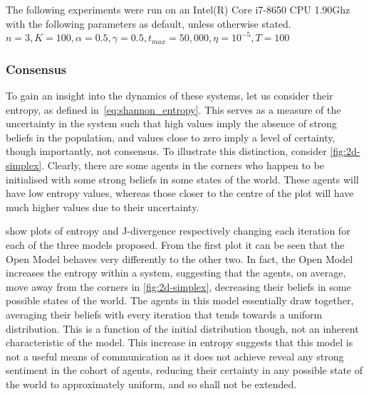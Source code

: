 The following experiments were run on an Intel(R) Core i7-8650 CPU \@ 1.90Ghz with the following parameters as default, unless otherwise stated. $n=3, K=100, \alpha = 0.5, \gamma = 0.5, t_{max} = 50,000, \eta = 10^{-5}, T=100$
\subsubsection{Consensus}

To gain an insight into the dynamics of these systems, let us consider their entropy, as defined in~\cref{eq:shannon_entropy}. This serves as a measure of the uncertainty in the system such that high values imply the absence of strong beliefs in the population, and values close to zero imply a level of certainty, though importantly, not consensus. To illustrate this distinction, consider \cref{fig:2d-simplex}. Clearly, there are some agents in the corners who happen to be initialised with some strong beliefs in some states of the world. These agents will have low entropy values, whereas those closer to the centre of the plot will have much higher values due to their uncertainty. 


 show plots of entropy and J-divergence respectively changing each iteration for each of the three models proposed. From the first plot it can be seen that the Open Model behaves very differently to the other two. In fact, the Open Model increases the entropy within a system, suggesting that the agents, on average, move away from the corners in \cref{fig:2d-simplex}, decreasing their beliefs in some possible states of the world. The agents in this model essentially draw together, averaging their beliefs with every iteration that tends towards a uniform distribution. This is a function of the initial distribution though, not an inherent characteristic of the model. This increase in entropy suggests that this model is not a useful means of communication as it does not achieve reveal any strong sentiment in the cohort of agents, reducing their certainty in any possible state of the world to approximately uniform, and so shall not be extended.


